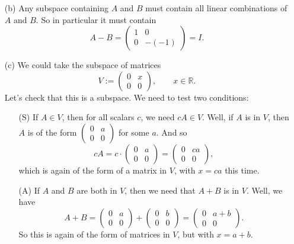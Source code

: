 \documentclass[11pt]{article}
\newcommand{\rr}{\mathbb{R}}
\begin{document}
\begin{enumerate}
\begin{enumerate}
\begin{enumerate}
\item[(b)] Any subspace containing $A$ and $B$ must contain all linear combinations of $A$ and $B$.  So in particular it must contain
\[A - B = \begin{pmatrix} 1 & 0 \\ 0 & -(-1) \end{pmatrix} = I.\]

\item[(c)] We could take the subspace of matrices 
\[ V := \begin{pmatrix} 0 & x \\ 0 & 0 \end{pmatrix}, \qquad x \in \rr.\]
Let's check that this is a subspace.  We need to test two conditions:
\begin{enumerate}
\item[(S)] If $A \in V$, then for all scalars $c$, we need $cA \in V$.  Well, if $A$ is in $V$, then $A$ is of the form $\begin{pmatrix} 0 & a \\ 0 & 0 \end{pmatrix}$ for some $a$.  And so 
\[cA = c \cdot \begin{pmatrix} 0 & a \\ 0 & 0 \end{pmatrix} = \begin{pmatrix} 0 & ca \\ 0 & 0 \end{pmatrix},\]
which is again of the form of a matrix in $V$, with $x = ca$ this time.

\item[(A)] If $A$ and $B$ are both in $V$, then we need that $A + B$ is in $V$.  Well, we have
\[A + B = \begin{pmatrix} 0 & a \\ 0 & 0 \end{pmatrix} + \begin{pmatrix} 0 & b \\ 0 & 0 \end{pmatrix} = \begin{pmatrix} 0 & a+b \\ 0 & 0 \end{pmatrix}.\]
So this is again of the form of matrices in $V$, but with $x = a + b$.

\end{enumerate}

\end{enumerate}

\end{enumerate}



\end{enumerate}
\end{document}
